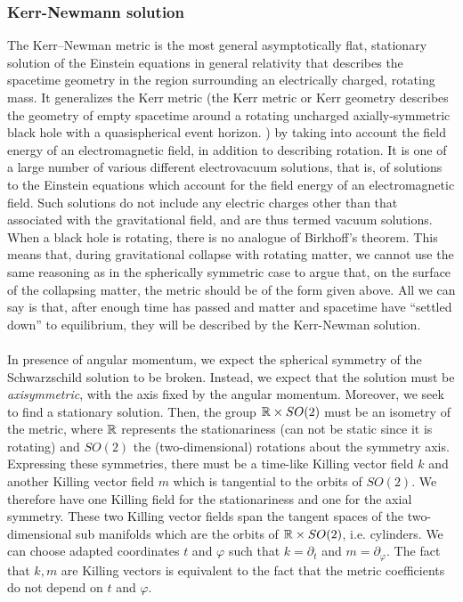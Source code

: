 \subsubsection{Kerr-Newmann solution}
The Kerr–Newman metric is the most general asymptotically flat, stationary solution of the Einstein equations in general relativity that describes the spacetime geometry in the region surrounding an electrically charged, rotating mass. It generalizes the Kerr metric (the Kerr metric or Kerr geometry describes the geometry of empty spacetime around a rotating uncharged axially-symmetric black hole with a quasispherical event horizon. ) by taking into account the field energy of an electromagnetic field, in addition to describing rotation. It is one of a large number of various different electrovacuum solutions, that is, of solutions to the Einstein equations which account for the field energy of an electromagnetic field. Such solutions do not include any electric charges other than that associated with the gravitational field, and are thus termed vacuum solutions. When a black hole is rotating, there is no analogue of Birkhoff’s theorem. This
means that, during gravitational collapse with rotating matter, we cannot use the
same reasoning as in the spherically symmetric case to argue that, on the surface of
the collapsing matter, the metric should be of the form given above. All we can say
is that, after enough time has passed and matter and spacetime have “settled down”
to equilibrium, they will be described by the Kerr-Newman solution.\\
\\
In presence of angular momentum, we expect the spherical symmetry
of the Schwarzschild solution to be broken. Instead, we expect that
the solution must be \emph{axisymmetric}, with the axis fixed by the angular
momentum. Moreover, we seek to find a stationary solution.
Then, the group $\mathbb{R} \times SO(2)$ must be an isometry of the metric, where
$\mathbb{R}$ represents the stationariness (can not be static since it is rotating) and $SO(2)$ the (two-dimensional) rotations
about the symmetry axis. Expressing these symmetries, there must be a
time-like Killing vector field $k$ and another Killing vector field $m$ which
is tangential to the orbits of $SO(2)$. We therefore have one Killing field for the stationariness and one for the axial symmetry.
These two Killing vector fields span the tangent spaces of the two-dimensional sub manifolds which are the orbits of $\mathbb{R} \times SO(2)$, i.e. cylinders.
We can choose adapted coordinates $t$ and $\varphi$ such that $k = \partial_t$ and $m = \partial_{\varphi}$. The fact that $k,m$ are Killing vectors is equivalent to the fact that the metric coefficients do not depend on $t$ and $\varphi$.
